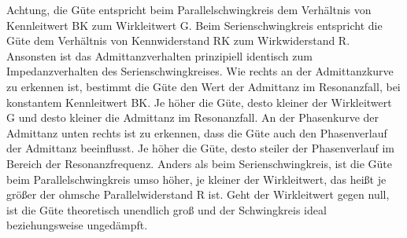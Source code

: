 \begin{frame}
{Achtung, die Güte entspricht beim Parallelschwingkreis dem Verhältnis von Kennleitwert BK zum Wirkleitwert G.
Beim Serienschwingkreis entspricht die Güte dem Verhältnis von Kennwiderstand RK zum Wirkwiderstand R.
Ansonsten ist das Admittanzverhalten prinzipiell identisch zum Impedanzverhalten des Serienschwingkreises.
Wie rechts an der Admittanzkurve zu erkennen ist, bestimmt die Güte den Wert der Admittanz im Resonanzfall, bei konstantem Kennleitwert BK.
Je höher die Güte, desto kleiner der Wirkleitwert G und desto kleiner die Admittanz im Resonanzfall.
An der Phasenkurve der Admittanz unten rechts ist zu erkennen, dass die Güte auch den Phasenverlauf der Admittanz beeinflusst.
Je höher die Güte, desto steiler der Phasenverlauf im Bereich der Resonanzfrequenz.
Anders als beim Serienschwingkreis, ist die Güte beim Parallelschwingkreis umso höher, je kleiner der Wirkleitwert, das heißt je größer der ohmsche Parallelwiderstand R ist. 
Geht der Wirkleitwert gegen null, ist die Güte theoretisch unendlich groß und der Schwingkreis ideal beziehungsweise ungedämpft.
}%
\end{frame}%


